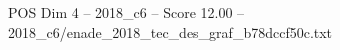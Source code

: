 \begin{textsample}{POS Dim 4 – 2018\_c6 – Score 12.00 – 2018\_c6/enade\_2018\_tec\_des\_graf\_b78dccf50c.txt}
\end{textsample}
